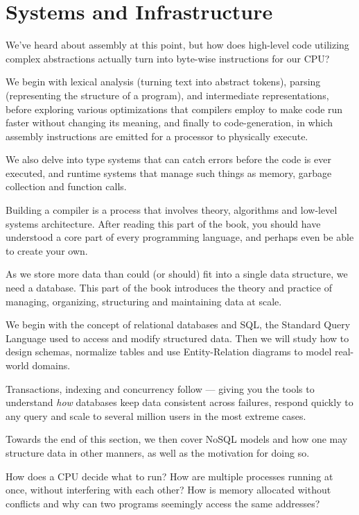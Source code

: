 \section{Systems and Infrastructure}
\begin{itemize}
  We've heard about assembly at this point, but how does high-level code
  utilizing complex abstractions actually turn into
  byte-wise instructions for our CPU\@?

  We begin with lexical analysis (turning text into abstract tokens),
  parsing (representing the structure of a program), and intermediate
  representations, before exploring various optimizations that compilers
  employ to make code run faster without changing its meaning, and finally
  to code-generation, in which assembly instructions are emitted for a processor
  to physically execute.

  We also delve into type systems that can catch errors before the code is ever
  executed, and runtime systems that manage such things as memory, garbage
  collection and function calls.

  Building a compiler is a process that involves theory, algorithms and
  low-level systems architecture. After reading this part of the book, you
  should have understood a core part of every programming language, and perhaps
  even be able to create your own.

  As we store more data than could (or should) fit into a single data structure,
  we need a database. This part of the book introduces the theory and practice
  of managing, organizing, structuring and maintaining data at scale.

  We begin with the concept of relational databases and SQL, the Standard Query
  Language used to access and modify structured data. Then we will study how to
  design schemas, normalize tables and use Entity-Relation diagrams to model
  real-world domains.

  Transactions, indexing and concurrency follow --- giving you the tools to
  understand \emph{how} databases keep data consistent across failures, respond
  quickly to any query and scale to several million users in the most extreme
  cases.

  Towards the end of this section, we then cover NoSQL models and how one may
  structure data in other manners, as well as the motivation for doing so.

  How does a CPU decide what to run? How are multiple processes running at once,
  without interfering with each other? How is memory allocated without conflicts
  and why can two programs seemingly access the same addresses?


\end{itemize}

